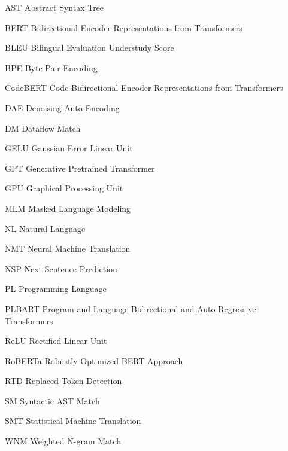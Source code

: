 \newcommand{\abbrlabel}[1]{\makebox[2.5cm][l]{\textbf{#1}}}
\newenvironment{abbreviations}{\begin{list}{}{\renewcommand{\makelabel}{\abbrlabel}\setlength{\itemsep}{-6.5pt}}}{\end{list}}
\begin{abbreviations}
	\item[AST] Abstract Syntax Tree
	\item[BERT] Bidirectional Encoder Representations from Transformers
	\item[BLEU] Bilingual Evaluation Understudy Score
	\item[BPE] Byte Pair Encoding
	\item[CodeBERT] Code Bidirectional Encoder Representations from Transformers
	\item[DAE] Denoising Auto-Encoding
	\item[DM] Dataflow Match
	\item[GELU] Gaussian Error Linear Unit
	\item[GPT] Generative Pretrained Transformer
	\item[GPU] Graphical Processing Unit
	\item[MLM] Masked Language Modeling
	\item[NL] Natural Language
	\item[NMT] Neural Machine Translation
	\item[NSP] Next Sentence Prediction
	\item[PL] Programming Language
	\item[PLBART] Program and Language Bidirectional and Auto-Regressive Transformers
	\item[ReLU] Rectified Linear Unit
	\item[RoBERTa] Robustly Optimized BERT Approach
	\item[RTD] Replaced Token Detection
	\item[SM] Syntactic AST Match
	\item[SMT] Statistical Machine Translation
	\item[WNM] Weighted N-gram Match
\end{abbreviations}


